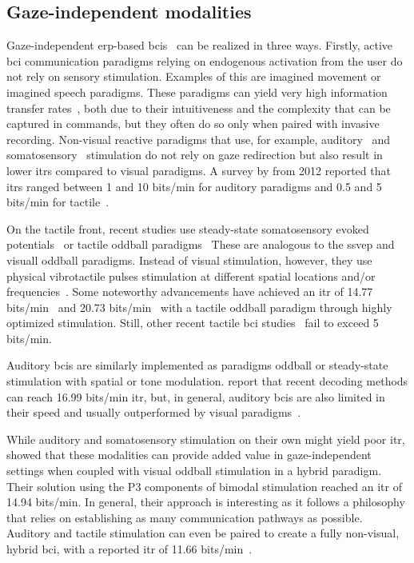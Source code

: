 \subsection{Gaze-independent modalities}
Gaze-independent \ac{erp}-based \acp{bci}~\cite{Riccio2012, Aloise2012} can be realized in three
ways.
Firstly, active \ac{bci} communication paradigms relying on endogenous activation from the user
do not rely on sensory stimulation.
Examples of this are imagined movement or imagined speech paradigms.
These paradigms can yield very high information transfer
rates~\cite{Willett2021,Metzger2023}, both due to their intuitiveness and the
complexity that can be captured in commands, but they often do so only when paired
with invasive recording.
Non-visual reactive paradigms that use, for example, auditory~\cite{Halder2010} and
somatosensory~\cite{Brouwer2010} stimulation do not rely on gaze redirection
but also result in lower \acp{itr} compared to visual paradigms.
A survey by \textcite{Riccio2012} from 2012 reported that \acp{itr} ranged between
1 and 10 bits/min for auditory paradigms and 0.5 and 5 bits/min for tactile~\cite{Riccio2012}.

On the tactile front, recent studies use steady-state somatosensory evoked
potentials~\cite{Petit2021} or tactile oddball paradigms~\cite{Waal2012}
These are analogous to the \ac{ssvep} and visuall oddball paradigms.
Instead of visual stimulation, however, they use physical vibrotactile pulses
stimulation at different spatial locations and/or frequencies~\cite{Han2020}.
Some noteworthy advancements have achieved an \ac{itr} of 14.77 bits/min~\cite{Liu2019}
and 20.73 bits/min~\cite{Herweg2016} with a tactile oddball paradigm through
highly optimized stimulation.
Still, other recent tactile \ac{bci} studies~\cite{Herweg2016a,Han2020,Jin2020,Li2019,Eidel2022}
fail to exceed 5 bits/min.

Auditory \acp{bci} are similarly implemented as paradigms oddball or
steady-state stimulation with spatial or tone modulation.
\textcite{Zhang2020} report that recent decoding methods can reach 16.99
bits/min \ac{itr}, but, in general, auditory \acp{bci} are also limited in
their speed and usually outperformed by visual paradigms~\cite{Rezeika2018}.

While auditory and somatosensory stimulation on their own might yield poor
\ac{itr}, \textcite{Yin2016} showed that these modalities can provide added
value in gaze-independent settings when coupled with visual oddball
stimulation in a hybrid paradigm.
Their solution using the P3 components of bimodal stimulation reached an \ac{itr} of 14.94 bits/min.
In general, their approach is interesting as it follows a philosophy that
relies on establishing as many communication pathways as possible.
Auditory and tactile stimulation can even be paired to create a fully
non-visual, hybrid \ac{bci}, with a reported \ac{itr} of 11.66 bits/min~\cite{Zhang2020}.

